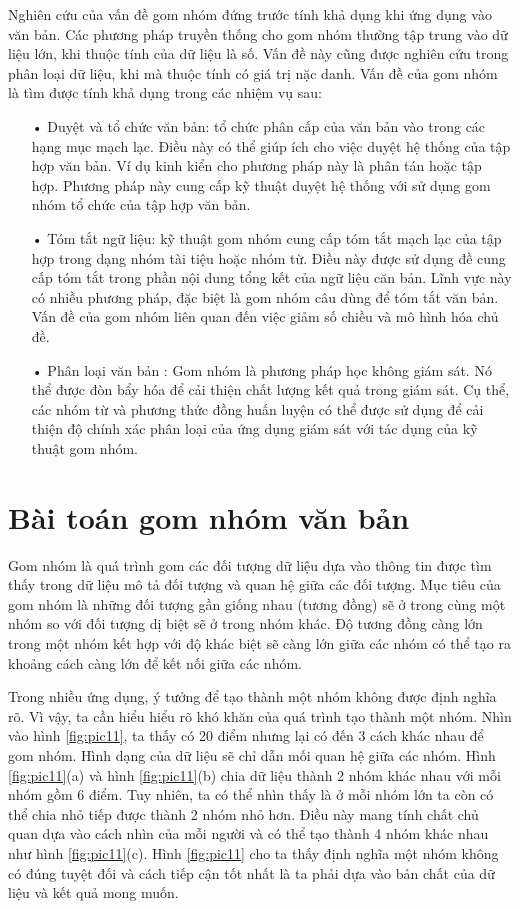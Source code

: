 Nghiên cứu của vấn đề gom nhóm đứng trước tính khả dụng khi ứng dụng vào văn bản. Các phương pháp truyền thống cho gom nhóm thường tập trung vào dữ liệu lớn, khi thuộc tính của dữ liệu là số. Vấn đề này cũng được nghiên cứu trong phân loại dữ liệu, khi mà thuộc tính có giá trị nặc danh. Vấn đề của gom nhóm là tìm được tính khả dụng trong các nhiệm vụ sau:
\begin{enumerate}
\item[•]Duyệt và tổ chức văn bản: tổ chức phân cấp của văn bản vào trong các hạng mục mạch lạc. Điều này có thể giúp ích cho việc duyệt hệ thống của tập hợp văn bản. Ví dụ kinh kiển cho phương pháp này là phân tán hoặc tập hợp. Phương pháp này cung cấp kỹ thuật duyệt hệ thống với sử dụng gom nhóm tổ chức của tập hợp văn bản.
\item[•]Tóm tắt ngữ liệu: kỹ thuật gom nhóm cung cấp tóm tắt mạch lạc của tập hợp trong dạng nhóm tài tiệu hoặc nhóm từ. Điều này được sử dụng đề cung cấp tóm tắt trong phần nội dung tổng kết của ngữ liệu căn bản. Lĩnh vực này có nhiều phương pháp, đặc biệt là gom nhóm câu dùng để tóm tắt văn bản. Vấn đề của gom nhóm liên quan đến việc giảm số chiều và mô hình hóa chủ đề. 
\item[•]Phân loại văn bản : Gom nhóm là phương pháp học không giám sát. Nó thể được đòn bẩy hóa để cải thiện chất lượng kết quả trong giám sát. Cụ thể, các nhóm từ và phương thức đồng huấn luyện có thể được sử dụng để cải thiện độ chính xác phân loại của ứng dụng giám sát với tác dụng của kỹ thuật gom nhóm.
\end{enumerate}

\section{Bài toán gom nhóm văn bản}
Gom nhóm là quá trình gom các đối tượng dữ liệu dựa vào thông tin được tìm thấy trong dữ liệu mô tả đối tượng và quan hệ giữa các đối tượng.
Mục tiêu của gom nhóm là những đối tượng gần giống nhau (tương đồng) sẽ ở trong cùng một nhóm so với đối tượng dị biệt sẽ ở trong nhóm khác.
Độ tương đồng càng lớn trong một nhóm kết hợp với độ khác biệt sẽ càng lớn giữa các nhóm có thể tạo ra khoảng cách càng lớn để kết nối giữa các nhóm.

Trong nhiều ứng dụng, ý tưởng để tạo thành một nhóm không được định nghĩa rõ.
Vì vậy, ta cần hiểu hiểu rõ khó khăn của quá trình tạo thành một nhóm.
Nhìn vào hình \ref{fig:pic11}, ta thấy có 20 điểm nhưng lại có đến 3 cách khác nhau để gom nhóm.
Hình dạng của dữ liệu sẽ chỉ dẫn mối quan hệ giữa các nhóm.
Hình \ref{fig:pic11}(a) và hình \ref{fig:pic11}(b) chia dữ liệu thành 2 nhóm khác nhau với mỗi nhóm gồm 6 điểm.
Tuy nhiên, ta có thể nhìn thấy là ở mỗi nhóm lớn ta còn có thể chia nhỏ tiếp được thành 2 nhóm nhỏ hơn.
Điều này mang tính chất chủ quan dựa vào cách nhìn của mỗi người và có thể tạo thành 4 nhóm khác nhau như hình \ref{fig:pic11}(c).
Hình \ref{fig:pic11} cho ta thấy định nghĩa một nhóm không có đúng tuyệt đối và cách tiếp cận tốt nhất là ta phải dựa vào bản chất của dữ liệu và kết quả mong muốn.

